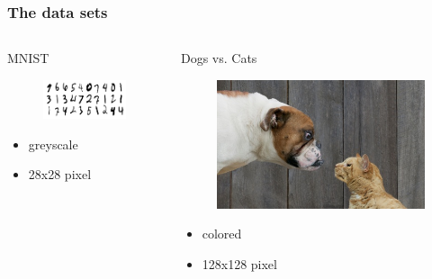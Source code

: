 \documentclass[handout]{beamer}
\begin{document}
\begin{frame}
\frametitle{The data sets} 
\begin{columns}[T]
\begin{column}{0.5\textwidth}
\centering
MNIST
\begin{figure}
\includegraphics[height=0.5\linewidth]{./pictures/MNIST.png}
\end{figure}
\begin{itemize}
\item greyscale
\item 28x28 pixel
\end{itemize}
\end{column}
\begin{column}{0.5\textwidth}
\centering
Dogs vs. Cats
\begin{figure}
\includegraphics[height=0.5\linewidth]{./pictures/dogs_vs_cats.jpg}
\end{figure}
\hspace{1em}
\begin{itemize}
\item colored
\item 128x128 pixel
\end{itemize}
\end{column}
\end{columns}

\end{frame} 
\end{document}
